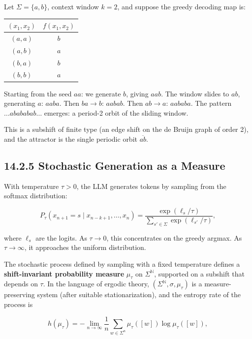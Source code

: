\begin{example}
Let $\Sigma = \{ a, b\} $, context window $k = 2$, and suppose the greedy decoding map is:

\begin{center}
\begin{tabular}{cc}
\toprule
$(x_1, x_2)$ & $f(x_1, x_2)$ \\
\midrule
$(a, a)$ & $b$ \\
$(a, b)$ & $a$ \\
$(b, a)$ & $b$ \\
$(b, b)$ & $a$ \\
\bottomrule
\end{tabular}
\end{center}

Starting from the seed $aa$: we generate $b$, giving $aab$. The window slides to $ab$, generating $a$: $aaba$. Then $ba \to b$: $aabab$. Then $ab \to a$: $aababa$. The pattern $\ldots abababab\ldots$ emerges: a period-2 orbit of the sliding window.

This is a subshift of finite type (an edge shift on the de Bruijn graph of order 2), and the attractor is the single periodic orbit $\overline{ab}$.
\end{example}

\subsection{14.2.5 Stochastic Generation as a Measure}

With temperature $\tau > 0$, the LLM generates tokens by sampling from the softmax distribution:

\[P_\tau(x_{n+1} = s \mid x_{n-k+1}, \ldots, x_n) = \frac{\exp(\ell_s / \tau)}{\sum_{s' \in \Sigma} \exp(\ell_{s'} / \tau)},\]

where $\ell_s$ are the logits. As $\tau \to 0$, this concentrates on the greedy argmax. As $\tau \to \infty$, it approaches the uniform distribution.

The stochastic process defined by sampling with a fixed temperature defines a \textbf{shift-invariant probability measure} $\mu_\tau$ on $\Sigma^{\mathbb{N}}$, supported on a subshift that depends on $\tau$. In the language of ergodic theory, $(\Sigma^{\mathbb{N}}, \sigma, \mu_\tau)$ is a measure-preserving system (after suitable stationarization), and the entropy rate of the process is

\[h(\mu_\tau) = -\lim_{n \to \infty} \frac{1}{n} \sum_{w \in \Sigma^n} \mu_\tau([w]) \log \mu_\tau([w]),\]

